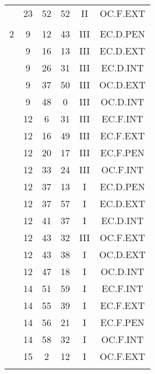 \documentclass[12pt, a4paper]{article}
\begin{document}
\begin{multicols}{3}
{\begin{tabular}{c c c c c c}
	 	 	 	 & 23 & 52 & 52 & II & OC.F.EXT\\%
	 	 	 	 & & & & & \\%
	 	 	 	2 & 9 & 12 & 43 & III & EC.D.PEN\\%
	 	 	 	 & 9 & 16 & 13 & III & EC.D.EXT\\%
	 	 	 	 & 9 & 26 & 31 & III & EC.D.INT\\%
	 	 	 	 & 9 & 37 & 50 & III & OC.D.EXT\\%
	 	 	 	 & 9 & 48 & 0 & III & OC.D.INT\\%
	 	 	 	 & 12 & 6 & 31 & III & EC.F.INT\\%
	 	 	 	 & 12 & 16 & 49 & III & EC.F.EXT\\%
	 	 	 	 & 12 & 20 & 17 & III & EC.F.PEN\\%
	 	 	 	 & 12 & 33 & 24 & III & OC.F.INT\\%
	 	 	 	 & 12 & 37 & 13 & I & EC.D.PEN\\%
	 	 	 	 & 12 & 37 & 57 & I & EC.D.EXT\\%
	 	 	 	 & 12 & 41 & 37 & I & EC.D.INT\\%
	 	 	 	 & 12 & 43 & 32 & III & OC.F.EXT\\%
	 	 	 	 & 12 & 43 & 38 & I & OC.D.EXT\\%
	 	 	 	 & 12 & 47 & 18 & I & OC.D.INT\\%
	 	 	 	 & 14 & 51 & 59 & I & EC.F.INT\\%
	 	 	 	 & 14 & 55 & 39 & I & EC.F.EXT\\%
	 	 	 	 & 14 & 56 & 21 & I & EC.F.PEN\\%
	 	 	 	 & 14 & 58 & 32 & I & OC.F.INT\\%
	 	 	 	 & 15 & 2 & 12 & I & OC.F.EXT\\%
	 	 	 	 & & & & & \\%

\end{tabular}}
\end{multicols}
\end{document}
